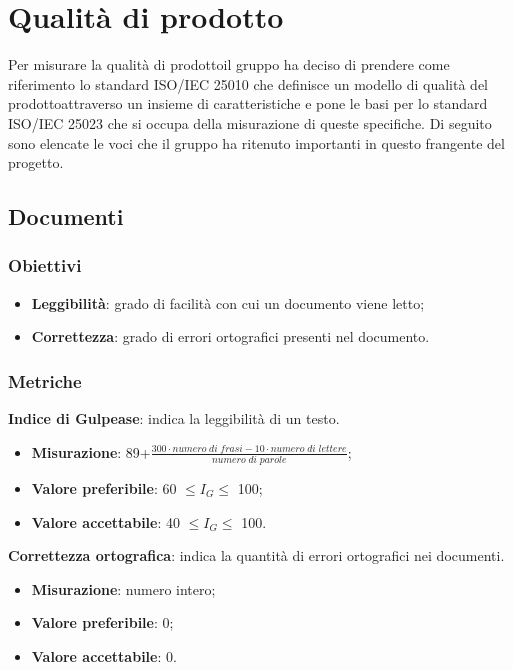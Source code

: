 \section{Qualità di prodotto}
    Per misurare la qualità di prodotto\glosp il gruppo ha deciso di prendere come riferimento lo standard ISO/IEC 25010 che definisce un modello di qualità del prodotto\glosp attraverso un insieme di caratteristiche e pone le basi per lo standard ISO/IEC 25023 che si occupa della misurazione di queste specifiche. Di seguito sono elencate le voci che il gruppo ha ritenuto importanti in questo frangente del progetto\glo.
    \subsection{Documenti}
    	\subsubsection{Obiettivi}
    		\begin{itemize}
    			\item \textbf{Leggibilità}: grado di facilità con cui un documento viene letto;
    			\item \textbf{Correttezza}: grado di errori ortografici presenti nel documento.
    		\end{itemize}
	    \subsubsection{Metriche}
	    \textbf{Indice di Gulpease}: indica la leggibilità di un testo.
	    \begin{itemize}
	    	\item \textbf{Misurazione}: 89+$\frac{300\cdot numero \; di \; frasi-10\cdot numero \; di \; lettere}{numero \; di \; parole}$;
	    	\item \textbf{Valore preferibile}: 60 $\le I_{G} \le$ 100;
	    	\item \textbf{Valore accettabile}: 40 $\le I_{G} \le$ 100.
	    \end{itemize}
	    \textbf{Correttezza ortografica}: indica la quantità di errori ortografici nei documenti.
	    \begin{itemize}
	    	\item \textbf{Misurazione}: numero intero;
	    	\item \textbf{Valore preferibile}: 0;
	    	\item \textbf{Valore accettabile}: 0.
	    \end{itemize}
